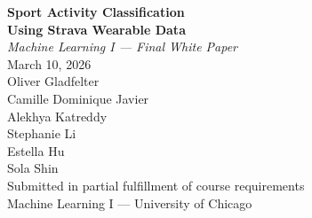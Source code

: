 \documentclass[11pt, onecolumn]{article}
\begin{document}
\begin{titlepage}
\centering
\vspace*{2cm}
{\huge\bfseries Sport Activity Classification\\[0.3cm]
Using Strava Wearable Data}\\[0.4cm]
{\large\itshape Machine Learning I --- Final White Paper}\\[0.5cm]
{\normalsize March 10, 2026}\\[2cm]
{\large
Oliver Gladfelter \\[0.3cm]
Camille Dominique Javier \\[0.3cm]
Alekhya Katreddy \\[0.3cm]
Stephanie Li \\[0.3cm]
Estella Hu \\[0.3cm]
Sola Shin \\[0.3cm]
}
\vfill
{\small Submitted in partial fulfillment of course requirements\\
Machine Learning I --- University of Chicago}
\end{titlepage}
\end{document}
